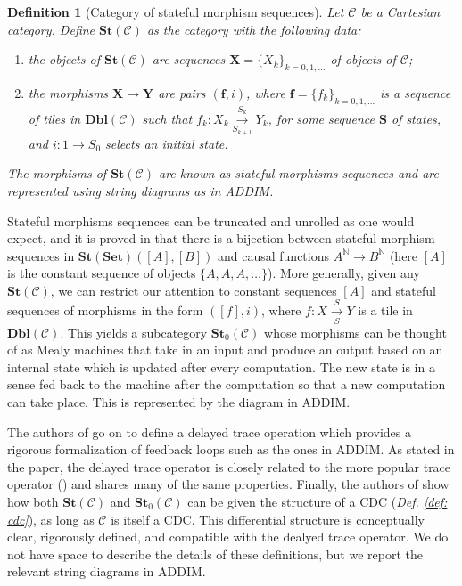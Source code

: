 \documentclass[11pt,a4paper,openright,twoside]{report}
\newcounter{mycounter}
\theoremstyle{plain}
\newtheorem{definition}[mycounter]{Definition}
\theoremstyle{definition}
\begin{document}
\begin{definition}[Category of stateful morphism sequences]
  Let $\mathcal{C}$ be a Cartesian category. Define $\mathbf{St}(\mathcal{C})$ as the category with the following data:
  \begin{enumerate}
    \item the objects of $\mathbf{St}(\mathcal{C})$ are sequences $\mathbf{X} = \{X_k\}_{k = 0,1,\dots}$ of objects of $\mathcal{C}$;
    \item the morphisms $\mathbf{X} \to \mathbf{Y}$ are pairs $(\mathbf{f}, i)$, where $\mathbf{f} = \{f_k\}_{k = 0,1,\dots}$ is a sequence of tiles in $\mathbf{Dbl}(\mathcal{C})$ such that $f_k: X_k \overset{S_k}{\underset{S_{k+1}}\longrightarrow} Y_k$, for some sequence $\mathbf{S}$ of states, and $i: 1 \to S_0$ selects an initial state. 
  \end{enumerate}
  The morphisms of $\mathbf{St}(\mathcal{C})$ are known as stateful morphisms sequences and are represented using string diagrams as in ADDIM.
\end{definition}

Stateful morphisms sequences can be truncated and unrolled as one would expect, and it is proved in \cite{sprunger2019differentiable} that there is a bijection between stateful morphism sequences in $\mathbf{St}(\mathbf{Set})([A],[B])$ and causal functions $A^{\mathbb{N}} \to B^{\mathbb{N}}$ (here $[A]$ is the constant sequence of objects $\{A,A,A,\dots\}$). More generally, given any $\mathbf{St}(\mathcal{C})$, we can restrict our attention to constant sequences $[A]$ and stateful sequences of morphisms in the form $([f],i)$, where $f:X \overset{S}{\underset{S}\longrightarrow} Y$ is a tile in $\mathbf{Dbl}(\mathcal{C})$. This yields a subcategory $\mathbf{St}_0(\mathcal{C})$ whose morphisms can be thought of as Mealy machines that take in an input and produce an output based on an internal state which is updated after every computation. The new state is in a sense fed back to the machine after the computation so that a new computation can take place. This is represented by the diagram in ADDIM.

The authors of \cite{sprunger2019differentiable} go on to define a delayed trace operation which provides a rigorous formalization of feedback loops such as the ones in ADDIM. As stated in the paper, the delayed trace operator is closely related to the more popular trace operator (\cite{joyal1996traced}) and shares many of the same properties. 
Finally, the authors of \cite{sprunger2019differentiable} show how both $\mathbf{St}(\mathcal{C})$ and $\mathbf{St}_0(\mathcal{C})$ can be given the structure of a CDC (\textit{Def. \ref{def: cdc}}), as long as $\mathcal{C}$ is itself a CDC. This differential structure is conceptually clear, rigorously defined, and compatible with the dealyed trace operator. We do not have space to describe the details of these definitions, but we report the relevant string diagrams in ADDIM.
\end{document}
